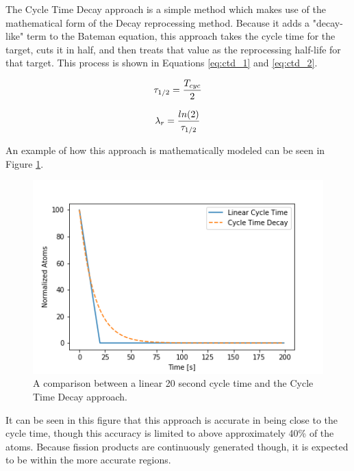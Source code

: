 The Cycle Time Decay approach is a simple method which makes use of the mathematical form of the Decay reprocessing method. Because it adds a "decay-like" term to the Bateman equation, this approach takes the cycle time for the target, cuts it in half, and then treats that value as the reprocessing half-life for that target. This process is shown in Equations \eqref{eq:ctd_1} and \eqref{eq:ctd_2}.

\begin{equation} \hfill
\tau_{1/2} = \frac{T_{cyc}}{2}
\hfill\label{eq:ctd_1} \end{equation}

\begin{equation} \hfill
\lambda_r = \frac{ln(2)}{\tau_{1/2}}
\hfill\label{eq:ctd_2} \end{equation}

An example of how this approach is mathematically modeled can be seen in Figure \ref{fig:ctd_examp}.

\begin{figure}[H]
  \centering
  \includegraphics[scale=0.6]{images/Cycle_Time_Decay_example_0.png}
  \caption{A comparison between a linear 20 second cycle time and the Cycle Time Decay approach.}
   \label{fig:ctd_examp}
\end{figure}

It can be seen in this figure that this approach is accurate in being close to the cycle time, though this accuracy is limited to above approximately 40\% of the atoms. Because fission products are continuously generated though, it is expected to be within the more accurate regions.


